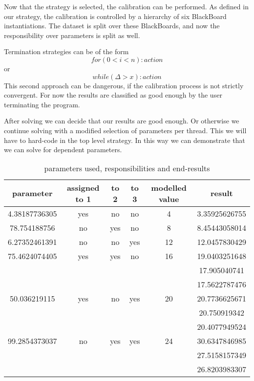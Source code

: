 \documentclass[]{lofar}
\begin{document}
      Now that the strategy is selected, the calibration can be
      performed.  As defined in our strategy, the calibration is
      controlled by a hierarchy of six BlackBoard instantiations. The
      dataset is split over these BlackBoards, and now the
      responsibility over parameters is split as well.

      Termination strategies can be of the form \[for ( 0 < i < n ) :
      action\] or \[while (\Delta > x): action\] This second
      approach can be dangerous, if the calibration process is not
      strictly convergent. For now the results are classified as good
      enough by the user terminating the program.

      After solving we can decide that our results are good enough. Or
      otherwise we continue solving with a modified selection of
      parameters per thread. This we will have to hard-code in the top
      level strategy. In this way we can demonstrate that we can solve
      for dependent parameters.

      \begin{table}[hbt]
        \begin{center}%
          \hypertarget{parametertable}{}%
          \caption{parameters used, responsibilities and end-results\label{tab:parametertable}}
          \begin{tabular}{|c|c|c|c|c|c|}
            \hline 
            parameter & assigned to 1 & to 2 & to 3 & modelled value & result\tabularnewline
            \hline 
            4.38187736305 & yes & no & no & 4 & 3.35925626755 \tabularnewline
            \hline 
            78.754188756 & no & yes & no & 8 & 8.45443058014 \tabularnewline
            \hline 
            6.27352461391 & no & no & yes & 12 & 12.0457830429 \tabularnewline
            \hline 
            75.4624074405 & yes & yes & no & 16 & 19.0403251648 \tabularnewline
            \hline 
            & & & & & 17.905040741 \tabularnewline
            \hline 
            & & & & & 17.5622787476 \tabularnewline
            \hline 
            50.036219115 & yes & no & yes & 20 & 20.7736625671 \tabularnewline
            \hline
            & & & & & 20.750919342 \tabularnewline
            \hline
            & & & & & 20.4077949524 \tabularnewline
            \hline
            99.2854373037 & no & yes & yes & 24 & 30.6347846985 \tabularnewline
            \hline 
            & & & & & 27.5158157349 \tabularnewline
            \hline
            & & & & & 26.8203983307 \tabularnewline
            \hline
          \end{tabular}
        \end{center}
      \end{table}
\end{document}
